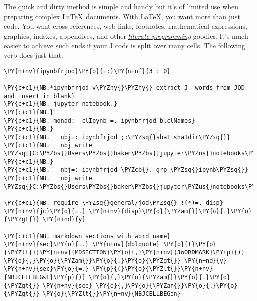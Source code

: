 The quick and dirty method is simple and handy but it's of limited use
when preparing complex \LaTeX\ documents. With \LaTeX, you want more than
just code. You want cross-references, web links, footnotes, mathematical
expressions, graphics, indexes, appendices, and other
\href{https://www-cs-faculty.stanford.edu/~knuth/lp.html}{\emph{literate
programming}} goodies. It's much easier to achieve such ends if your J
code is split over many cells. The following verb does just that.


 \begin{tcolorbox}[breakable, size=fbox, boxrule=1pt, pad at break*=1mm,colback=cellbackground, colframe=cellborder]
\begin{Verbatim}[commandchars=\\\{\}]
\PY{n+nv}{ipynbfrjod}\PY{o}{=:}\PY{n+nf}{3 : 0}

\PY{c+c1}{NB.*ipynbfrjod v\PYZhy{}\PYZhy{} extract J  words from JOD  and insert in blank}
\PY{c+c1}{NB. jupyter notebook.}
\PY{c+c1}{NB.}
\PY{c+c1}{NB. monad:  clIpynb =. ipynbfrjod blclNames}
\PY{c+c1}{NB.}
\PY{c+c1}{NB.   nbj=: ipynbfrjod ;:\PYZsq{}sha1 sha1dir\PYZsq{}}
\PY{c+c1}{NB.   nbj write \PYZsq{}C:\PYZbs{}Users\PYZbs{}baker\PYZbs{}jupyter\PYZus{}notebooks\PYZbs{}test0.ipynb\PYZsq{}}
\PY{c+c1}{NB.}
\PY{c+c1}{NB.   nbj=: ipynbfrjod \PYZcb{}. grp \PYZsq{}ipynb\PYZsq{}}
\PY{c+c1}{NB.   nbj write \PYZsq{}C:\PYZbs{}Users\PYZbs{}baker\PYZbs{}jupyter\PYZus{}notebooks\PYZbs{}ipynb\PYZus{}onself.ipynb\PYZsq{}}

\PY{c+c1}{NB. require \PYZsq{}general/jod\PYZsq{} !(*)=. disp}
\PY{n+nv}{jc}\PY{o}{=.} \PY{n+nv}{disp}\PY{o}{\PYZam{}}\PY{o}{.}\PY{o}{\PYZgt{}} \PY{n+nd}{y}

\PY{c+c1}{NB. markdown sections with word name}
\PY{n+nv}{sec}\PY{o}{=.} \PY{n+nv}{dblquote} \PY{p}{(}\PY{o}{\PYZlt{}}\PY{n+nv}{MDSECTION}\PY{o}{,}\PY{n+nv}{JWORDMARK}\PY{p}{)} \PY{o}{,}\PY{o}{\PYZam{}}\PY{o}{.}\PY{o}{\PYZgt{}} \PY{n+nd}{y}
\PY{n+nv}{sec}\PY{o}{=.} \PY{p}{(}\PY{o}{\PYZlt{}}\PY{n+nv}{NBJCELLBEGst}\PY{p}{)} \PY{o}{,}\PY{o}{\PYZam{}}\PY{o}{.}\PY{o}{\PYZgt{}} \PY{n+nv}{sec} \PY{o}{,}\PY{o}{\PYZam{}}\PY{o}{.}\PY{o}{\PYZgt{}} \PY{o}{\PYZlt{}}\PY{n+nv}{NBJCELLBEGen}


\end{Verbatim}
\end{tcolorbox}
